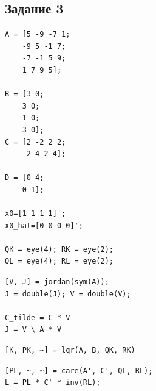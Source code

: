 \documentclass[a4paper,12pt]{article}
\begin{document}
\newpage
\subsection*{Задание 3}

\begin{lstlisting}[caption={Инициализация}]
A = [5 -9 -7 1;
	-9 5 -1 7;
	-7 -1 5 9;
	1 7 9 5];

B = [3 0;
	3 0;
	1 0;
	3 0];
C = [2 -2 2 2; 
	-2 4 2 4];

D = [0 4;
	0 1];

x0=[1 1 1 1]';
x0_hat=[0 0 0 0]';

QK = eye(4); RK = eye(2);
QL = eye(4); RL = eye(2);
\end{lstlisting}

\begin{lstlisting}[caption={Матрицы в Жордановом базисе}, label={lst:jordan3}]
[V, J] = jordan(sym(A));
J = double(J); V = double(V);

C_tilde = C * V
J = V \ A * V
\end{lstlisting}

\begin{lstlisting}[caption={Синтез матрицы регулятора \(K\)}, label={lst:K3}]
[K, PK, ~] = lqr(A, B, QK, RK)
\end{lstlisting}

\begin{lstlisting}[caption={Синтез матрицы наблюдателя \(L\)}, label={lst:L3}]
[PL, ~, ~] = care(A', C', QL, RL);
L = PL * C' * inv(RL);
\end{lstlisting}
	

	
\end{document}
